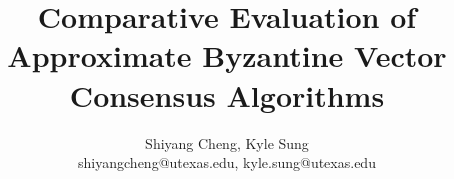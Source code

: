\documentclass[conference]{IEEEtran}
\begin{document}
\title{Comparative Evaluation of Approximate Byzantine Vector Consensus Algorithms}
\author{Shiyang Cheng, Kyle Sung\\ shiyangcheng@utexas.edu, kyle.sung@utexas.edu}

\maketitle
















\small

\end{document}
